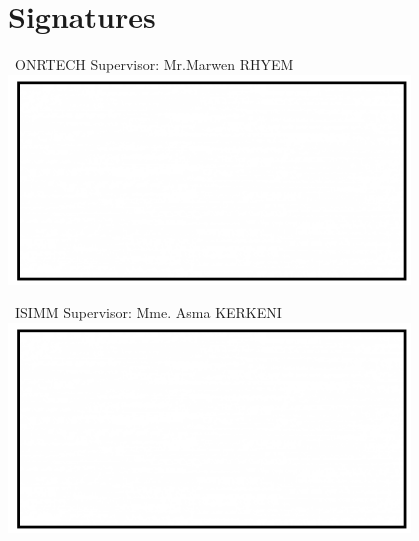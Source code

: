 
\chapter*{Signatures}
\thispagestyle{empty}
\bigskip
\begin{center}
\ {ONRTECH Supervisor: Mr.Marwen RHYEM }
\bigskip
\includegraphics[width=0.8\textwidth]{images/sig.png}
\end{center}

\bigskip
\begin{center}
\ {ISIMM Supervisor: Mme. Asma KERKENI }
\bigskip
\includegraphics[width=0.8\textwidth]{images/sig.png}
\end{center}